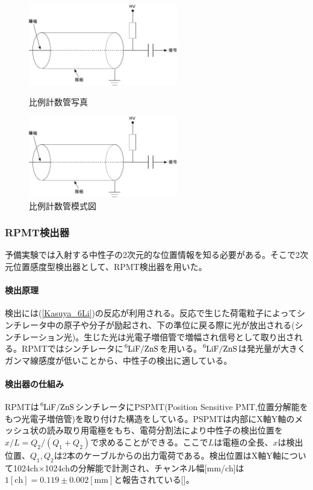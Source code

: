 \begin{figure}[h]
\begin{minipage}{0.5\hsize}
\begin{center}
\includegraphics[width=6.5cm]{detector/detector_fig1.pdf}
\caption{比例計数管写真}
\end{center}
\end{minipage}
\begin{minipage}{0.5\hsize}
\begin{center}
\includegraphics[width=6.5cm]{detector/detector_fig1.pdf}
\caption{比例計数管模式図}
\end{center}
\end{minipage}
\end{figure}

\subsubsection{RPMT検出器}
予備実験では入射する中性子の2次元的な位置情報を知る必要がある。そこで2次元位置感度型検出器として、RPMT検出器を用いた。

\paragraph{検出原理}
検出には(\ref{Kasuya_6Li})の反応が利用される。反応で生じた荷電粒子によってシンチレータ中の原子や分子が励起され、下の準位に戻る際に光が放出される(シンチレーション光)。生じた光は光電子増倍管で増幅され信号として取り出される。RPMTではシンチレータに$\ce{^6LiF}/\ce{ZnS}$を用いる。$\ce{^6LiF}/\ce{ZnS}$は発光量が大きくガンマ線感度が低いことから、中性子の検出に適している。

\paragraph{検出器の仕組み}
RPMTは$\ce{^6LiF}/\ce{ZnS}$シンチレータにPSPMT(Position Sensitive PMT,位置分解能をもつ光電子増倍管)を取り付けた構造をしている。PSPMTは内部にX軸Y軸のメッシュ状の読み取り用電極をもち、電荷分割法により中性子の検出位置を$x/L=Q_2/(Q_1+Q_2)$で求めることができる。ここで$L$は電極の全長、$x$は検出位置、$Q_1,Q_2$は2本のケーブルからの出力電荷である。検出位置はX軸Y軸について1024ch$\times$1024chの分解能で計測され、チャンネル幅[mm/ch]は$1\mathrm{[ch]}=0.119\pm0.002\mathrm{[mm]}$と報告されている[]。


